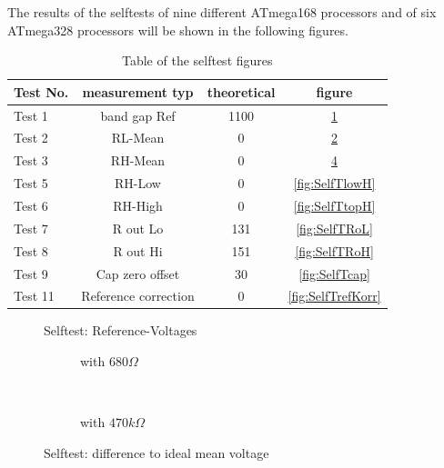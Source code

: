 The results of the selftests of nine different ATmega168 processors and of six ATmega328 processors
will be shown in the following figures.

\begin{table}[H]
  \begin{center}
    \begin{tabular}{| l | c | c | c |}
    \hline
Test No. & measurement typ & theoretical & figure \\
    \hline
    \hline
Test 1 & band gap Ref  & 1100 & \ref{fig:SelfTref} \\
    \hline
Test 2 & RL-Mean & 0 & \ref{fig:SelfTMitL} \\
    \hline
Test 3 & RH-Mean & 0 & \ref{fig:SelfTMitH} \\
    \hline
Test 5 & RH-Low &  0 & \ref{fig:SelfTlowH} \\
    \hline
Test 6 & RH-High & 0 & \ref{fig:SelfTtopH} \\
    \hline
Test 7 & R out Lo & 131 & \ref{fig:SelfTRoL} \\
    \hline
Test 8 & R out Hi & 151 & \ref{fig:SelfTRoH} \\
    \hline
Test 9 & Cap zero offset & 30 & \ref{fig:SelfTcap} \\
    \hline
Test 11 & Reference correction & 0 & \ref{fig:SelfTrefKorr} \\
    \hline
    \end{tabular}
  \end{center}
  \caption{Table of the selftest figures }
  \label{tab:test_m168} 
\end{table}

\begin{figure}[H]
\centering

\caption{Selftest: Reference-Voltages}
\label{fig:SelfTref}
\end{figure}


\begin{figure}[H]
  \begin{subfigure}[b]{9cm}
    \centering
    \resizebox{9cm}{!}{}
    \caption{with \(680 \Omega\)}
    \label{fig:SelfTMitL}
  \end{subfigure}
  ~
  \begin{subfigure}[b]{9cm}
    \centering
    \resizebox{9cm}{!}{}
    \caption{with \(470 k\Omega\)}
    \label{fig:SelfTMitH}
  \end{subfigure}
  \caption{Selftest: difference to ideal mean voltage}
\end{figure}

